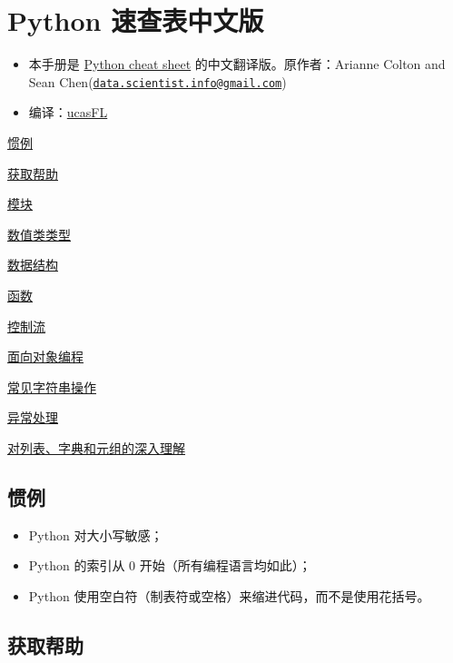 \documentclass[]{article}
\date{}
\begin{document}
\section{Python 速查表中文版}\label{header-n0}

\begin{itemize}
\item
  本手册是 \href{http://datasciencefree.com/python.pdf}{Python cheat
  sheet} 的中文翻译版。原作者：Arianne Colton and Sean
  Chen(\href{mailto:data.scientist.info@gmail.com}{\nolinkurl{data.scientist.info@gmail.com}})
\item
  编译：\href{https://github.com/ucasFL}{ucasFL}
\end{itemize}

\protect\hyperlink{header-n32}{惯例}

\protect\hyperlink{header-n43}{获取帮助}

\protect\hyperlink{header-n54}{模块}

\protect\hyperlink{header-n69}{数值类类型}

\protect\hyperlink{header-n128}{数据结构}

\protect\hyperlink{header-n217}{函数}

\protect\hyperlink{header-n307}{控制流}

\protect\hyperlink{header-n332}{面向对象编程}

\protect\hyperlink{header-n354}{常见字符串操作}

\protect\hyperlink{header-n357}{异常处理}

\protect\hyperlink{header-n369}{对列表、字典和元组的深入理解}

\hypertarget{header-n32}{\subsection{惯例}\label{header-n32}}

\begin{itemize}
\item
  Python 对大小写敏感；
\item
  Python 的索引从 0 开始（所有编程语言均如此）；
\item
  Python 使用空白符（制表符或空格）来缩进代码，而不是使用花括号。
\end{itemize}

\hypertarget{header-n43}{\subsection{获取帮助}\label{header-n43}}
\end{document}
